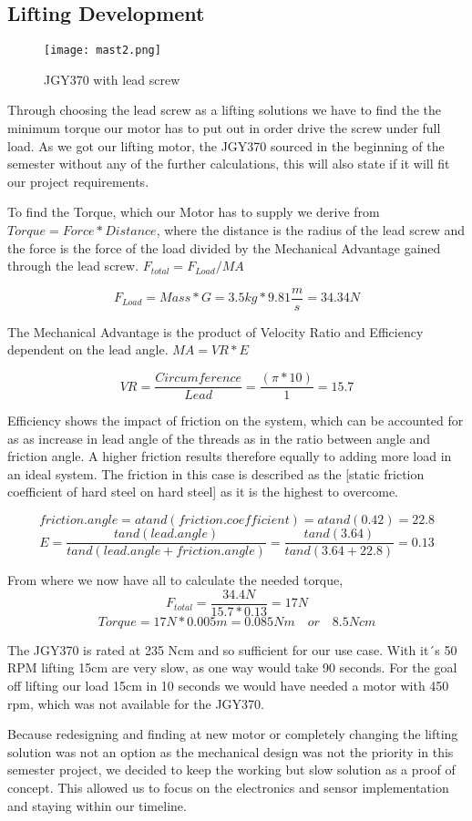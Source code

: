 \documentclass[../report.tex]{subfiles}
\begin{document}
\maketitle

\subsection{Lifting Development}
\begin{wrapfigure}{r}{0.5\textwidth}
    \centering
    \texttt{[image: mast2.png]}
    \caption{JGY370 with lead screw}
\end{wrapfigure}
Through choosing the lead screw as a lifting solutions we have to find the
the minimum torque our motor has to put out in order drive the screw under full load.
As we got our lifting motor, the JGY370 sourced in the beginning of the semester without 
any of the further calculations, this will also state if it will fit our project requirements.

To find the Torque, which our Motor has to supply we derive from $Torque=Force*Distance$, where the 
distance is the radius of the lead screw and the force is the force of the load divided by the Mechanical 
Advantage gained through the lead screw. $F_{total}=F_{Load}/MA$

\[F_{Load}=Mass*G=3.5kg*9.81\frac{m}{s}=34.34N\]

The Mechanical Advantage is the product of Velocity Ratio and Efficiency dependent on the lead 
angle. $MA=VR*E$ 

\[VR=\frac{Circumference}{Lead}=\frac{(\pi*10)}{1}=15.7\]

Efficiency shows the impact of friction on the system, which can be accounted for as as increase in lead angle of the threads 
as in the ratio between angle and friction angle. A higher friction results therefore equally to adding more load in an ideal 
system. The friction in this case is described as the \cite{friction_coefficient}[static 
friction coefficient of hard steel on hard steel] as it is the highest to overcome. 

\[friction.angle=atand(friction.coefficient)= atand(0.42)=22.8\]
\[E=\frac{tand(lead.angle)}{tand(lead.angle+friction.angle)}=\frac{tand(3.64)}{tand(3.64+22.8)}=0.13\]

From where we now have all to calculate the needed torque, 
\[F_{total}=\frac{34.4N}{15.7*0.13}=17N\]
\[Torque=17N*0.005m=0.085Nm\quad or \quad 8.5Ncm\]

The JGY370 is rated at 235 Ncm and so sufficient for our use case. With it´s 50 RPM
lifting 15cm are very slow, as one way would take 90 seconds. For the goal off lifting 
our load 15cm in 10 seconds we would have needed a motor with 450 rpm, which was not 
available for the JGY370.

Because redesigning and finding at new motor 
or completely changing the lifting solution was not an option as the mechanical design 
was not the priority in this semester project, we decided to keep the working but slow 
solution as a proof of concept. This allowed us to focus on the electronics and sensor 
implementation and staying within our timeline.
\end{document}
